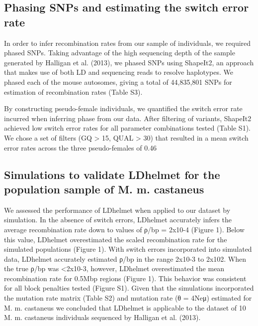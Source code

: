 \subsection{Phasing SNPs and estimating the switch error rate}
 
In order to infer recombination rates from our sample of individuals, we required phased SNPs. Taking advantage of the high sequencing depth of the sample generated by Halligan et al. (2013), we phased SNPs using ShapeIt2, an approach that makes use of both LD and sequencing reads to resolve haplotypes. We phased each of the mouse autosomes, giving a total of 44,835,801 SNPs for estimation of recombination rates (Table S3). 
 
By constructing pseudo-female individuals, we quantified the switch error rate incurred when inferring phase from our data. After filtering of variants, ShapeIt2 achieved low switch error rates for all parameter combinations tested (Table S1). We chose a set of filters (GQ > 15, QUAL > 30) that resulted in a mean switch error rates across the three pseudo-females of 0.46%
 
\subsection{Simulations to validate LDhelmet for the population sample of M. m. castaneus}
 
We assessed the performance of LDhelmet when applied to our dataset by simulation. In the absence of switch errors, LDhelmet accurately infers the average recombination rate down to values of ρ/bp = 2x10-4 (Figure 1). Below this value, LDhelmet overestimated the scaled recombination rate for the simulated populations (Figure 1). With switch errors incorporated into simulated data, LDhelmet accurately estimated ρ/bp in the range 2x10-3 to 2x102. When the true ρ/bp was <2x10-3, however, LDhelmet overestimated the mean recombination rate for 0.5Mbp regions (Figure 1). This behavior was consistent for all block penalties tested (Figure S1). Given that the simulations incorporated the mutation rate matrix (Table S2) and mutation rate (θ = 4Neμ) estimated for M. m. castaneus we concluded that LDhelmet is applicable to the dataset of 10 M. m. castaneus individuals sequenced by Halligan et al. (2013).
 

